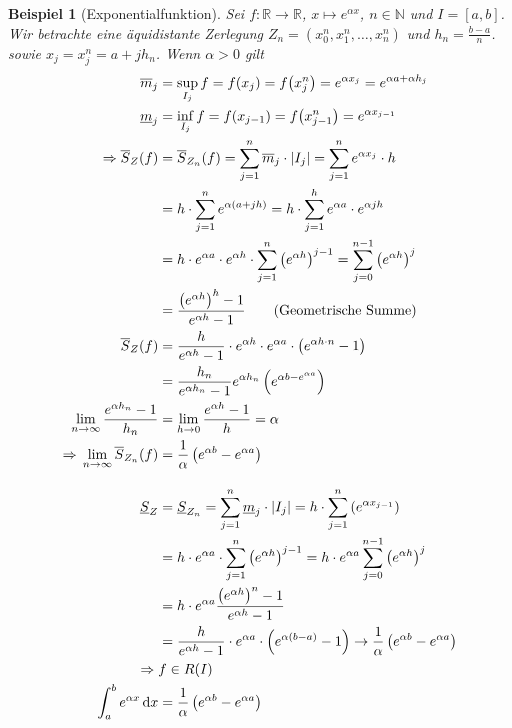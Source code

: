 \documentclass[11pt, twoside, a4paper]{article}
\theoremstyle{plain}
\newtheorem{beispiel}[blockelement]{Beispiel}
\newcommand{\pair}[1]{\left(#1\right)}
\newcommand{\of}[1]{\mathopen{}\mathclose{}\bgroup\left(#1\aftergroup\egroup\right)}
\newcommand{\abs}[1]{\left\lvert#1\right\rvert}
\newcommand{\interv}[1]{\left[#1\right]}
\newcommand{\impl}[0]{\Rightarrow{}}
\newcommand{\fromto}{\rightarrow{}}
\newcommand{\dif}{\mathop{}\!\mathrm{d}}
\newcommand{\R}{\mathbb{R}}
\newcommand{\N}{\mathbb{N}}
\begin{document}
    \begin{beispiel}[Exponentialfunktion]
        \marginnote{[23. Apr]}
        Sei $f: \R\fromto\R$, $x\mapsto e^{\alpha x}$, $n\in\N$ und $I=\interv{a,b}$. Wir betrachte eine äquidistante Zerlegung $Z_n = \pair{x_0^n, x_1^n, \dots, x_n^n}$ und $h_n = \frac{b-a}{n}$. sowie $x_j = x_j^n=a+jh_n$. Wenn $\alpha > 0$ gilt
        \begin{align*}
            \overline{m}_j &= \sup_{I_j} f = f\of{x_j} = f\of{x_j^n} = e^{\alpha x_j} = e^{\alpha a + \alpha h_j}\\
            \underline{m}_j &= \inf_{I_j} f = f\of{x_{j-1}} = f\of{x_{j-1}^n} = e^{\alpha x_{j-1}}\\
            \impl \overline{S}_Z\of{f} &= \overline{S}_{Z_n}\of{f} = \sum_{j=1}^{n} \overline{m}_j \cdot\abs{I_j} = \sum_{j=1}^{n} e^{\alpha x_j} \cdot h\\
            &= h\cdot \sum_{j=1}^{n} e^{\alpha\pair{a+jh}} = h\cdot \sum_{j=1}^{h} e^{\alpha a}\cdot e^{\alpha jh}\\
            &= h\cdot e^{\alpha a}\cdot e^{\alpha h}\cdot \sum_{j=1}^{n} \pair{e^{\alpha h}}^{j-1} = \sum_{j=0}^{n-1} \pair{e^{\alpha h}}^{j}\\
            &= \frac{\pair{e^{\alpha h}}^h - 1}{e^{\alpha h} - 1}\tag{Geometrische Summe}\\
            \overline{S}_Z\of{f} &= \frac{h}{e^{\alpha h} - 1}\cdot e^{\alpha h}\cdot e^{\alpha a} \cdot \pair{e^{\alpha h\cdot n} - 1}\\
            &= \frac{h_n}{e^{\alpha h_n } - 1} e^{\alpha h_n} \pair{e^{\alpha b - e^{\alpha a}}}\\
            \lim_{n\fromto\infty} \frac{e^{\alpha h_n} - 1}{h_n} &= \lim_{h\fromto0} \frac{e^{\alpha h} - 1}{h} = \alpha\\
            \impl \lim_{n\fromto\infty} \overline{S}_{Z_n}\of{f} &= \frac{1}{\alpha}\pair{e^{\alpha b} - e^{\alpha a}}\\[10pt]
            \underline{S}_Z &= \underline{S}_{Z_n} = \sum_{j=1}^{n} \underline{m}_j \cdot \abs{I_j} = h\cdot \sum_{j=1}^{n} \pair{e^{\alpha x_{j-1}}}\\
            &= h\cdot e^{\alpha a}\cdot \sum_{j=1}^{n} \pair{e^{\alpha h}}^{j-1} = h\cdot e^{\alpha a} \sum_{j=0}^{n-1} \pair{e^{\alpha h}}^j\\
            &= h\cdot e^{\alpha a} \frac{\pair{e^{\alpha h}}^n - 1}{e^{\alpha h} - 1}\\
            &= \frac{h}{e^{\alpha h} - 1}\cdot e^{\alpha a}\cdot\pair{e^{\alpha\pair{b-a}} - 1} \fromto \frac{1}{\alpha} \pair{e^{\alpha b} - e^{\alpha a}}\\
            \impl &f\in R\of{I}\\
            \int_{a}^{b} e^{\alpha x} \dif x &= \frac{1}{\alpha} \pair{e^{\alpha b} - e^{\alpha a}}
        \end{align*}
    \end{beispiel}
\end{document}
